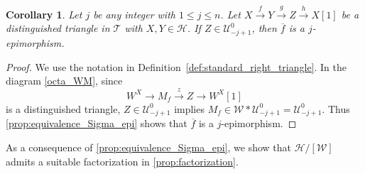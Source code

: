 \documentclass[a4paper,reqno,10pt]{amsart}
\newtheorem{corollary}[corollary]{Corollary}
\theoremstyle{definition}
\theoremstyle{definition}
\theoremstyle{definition}
\theoremstyle{definition}
\theoremstyle{plain}
\newcommand{\CH}{\mathcal{H}}
\newcommand{\CT}{\mathcal{T}}
\newcommand{\CU}{\mathcal{U}}
\newcommand{\CW}{\mathcal{W}}
\begin{document}
\begin{corollary}\label{cor:implication_Sigma_epi}
Let $j$ be any integer with $1\le j\le n$. 
Let $X\xrightarrow{f}Y\xrightarrow{g}Z\xrightarrow{h} X[1]$ be a distinguished triangle in $\CT$ with $X,Y\in\CH$.
If $Z\in\CU_{-j+1}^0$, then $\overline{f}$ is a $j$-epimorphism.
\end{corollary}
\begin{proof}
We use the notation in Definition~\ref{def:standard_right_triangle}.
In the diagram \eqref{octa_WM}, since
\[
W^X\to M_f\xrightarrow{z}Z\to W^X[1]
\]
is a distinguished triangle, $Z\in\CU_{-j+1}^0$ implies $M_f\in\CW\ast\CU_{-j+1}^0=\CU_{-j+1}^0$. %
Thus \cref{prop:equivalence_Sigma_epi} shows that $\overline{f}$ is a $j$-epimorphism. 
\end{proof}





As a consequence of \cref{prop:equivalence_Sigma_epi}, we show that $\CH/[\CW]$ admits a suitable factorization in \cref{prop:factorization}. 


\normalcolor
\end{document}
